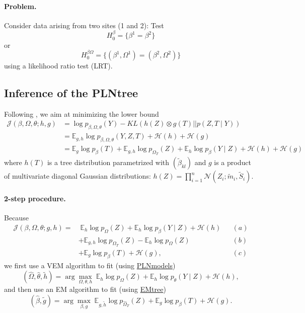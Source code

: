 \documentclass[a4paper, 10pt]{article}
\newcommand{\Esp}{\mathbb{E}}
\newcommand{\Hcal}{\mathcal{H}}
\newcommand{\Jcal}{\mathcal{J}}
\newcommand{\Ncal}{\mathcal{N}}
\begin{document}
\paragraph{Problem.} Consider data arising from two sites (1 and 2): Test
$$
H_0^\beta = \{\beta^1 = \beta^2\}
$$
or
$$
H_0^{\beta \Omega} = \{(\beta^1, \Omega^1) = (\beta^2, \Omega^2)\}
$$
using a likelihood ratio test (LRT).

\subsection{Inference of the PLNtree} 

Following \cite{MRA19}, we aim at minimizing the lower bound 
\begin{align*}
 \Jcal(\beta, \Omega, \theta; h, g) 
 & = \log p_{\beta, \Omega, \theta}(Y) - KL(h(Z) \otimes g(T) || p(Z, T \mid Y)) \\
 & = \Esp_{g, h} \log p_{\beta, \Omega, \theta}(Y, Z, T) + \Hcal(h) + \Hcal(g) \\
 & = \Esp_{g} \log p_{\beta}(T) + \Esp_{g, h} \log p_{\Omega_T}(Z) 
 + \Esp_{h} \log p_{\beta}(Y \mid Z) + \Hcal(h) + \Hcal(g) 
\end{align*}
where $h(T)$ is a tree distribution parametrized with $(\widetilde{\beta}_{kl})$ and $g$ is a product of multivariate diagonal Gaussian distributions: $h(Z) = \prod_{i=1}^n \Ncal(Z_i; \widetilde{m}_i, \widetilde{S}_i)$.

\paragraph{2-step procedure.} 
Because
\begin{align*}
 \Jcal(\beta, \Omega, \theta; g, h) 
 = & \; \Esp_{h} \log p_{\Omega}(Z) + \Esp_{h} \log p_{\beta}(Y \mid Z) + \Hcal(h) & & (a)\\
 & + \Esp_{g, h} \log p_{\Omega_T}(Z) - \Esp_{h} \log p_{\Omega}(Z) & & (b)\\
 & + \Esp_{g} \log p_{\beta}(T) + \Hcal(g), & & (c)
\end{align*}
we first use a VEM algorithm to fit (using \url{PLNmodels})
$$
(\widehat{\Omega}, \widehat{\theta}, \widetilde{h}) = \arg\max_{\Omega, \theta, h} \; \Esp_{h} \log p_{\Omega}(Z) + \Esp_{h} \log p_{\theta}(Y \mid Z) + \Hcal(h),
$$
and then use an EM algorithm to fit (using \url{EMtree})
$$
(\widehat{\beta}, \widetilde{g}) = \arg\max_{\beta, g} \; \Esp_{g, \widetilde{h}} \log p_{\widehat{\Omega}_T}(Z) + \Esp_{g} \log p_{\beta}(T) + \Hcal(g).
$$
\end{document}
